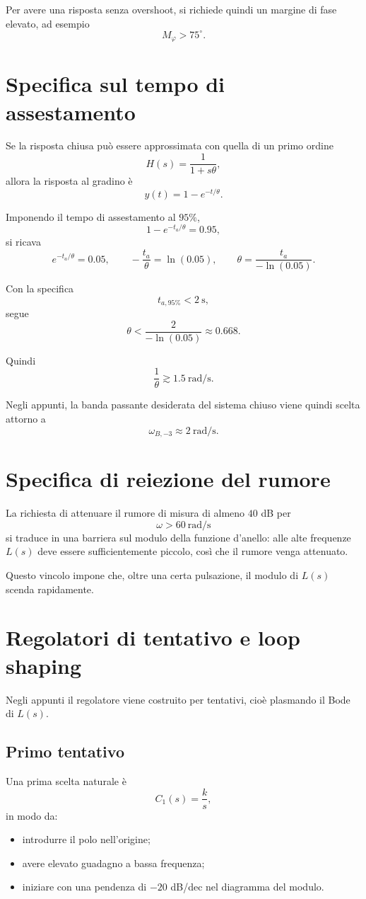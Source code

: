 Per avere una risposta senza overshoot, si richiede quindi un margine di fase elevato, ad esempio
\[
M_\varphi > 75^\circ.
\]

\section{Specifica sul tempo di assestamento}

Se la risposta chiusa pu\`o essere approssimata con quella di un primo ordine
\[
H(s)=\frac{1}{1+s\theta},
\]
allora la risposta al gradino \`e
\[
y(t)=1-e^{-t/\theta}.
\]

Imponendo il tempo di assestamento al \(95\%\),
\[
1-e^{-t_a/\theta}=0.95,
\]
si ricava
\[
e^{-t_a/\theta}=0.05,
\qquad
-\frac{t_a}{\theta}=\ln(0.05),
\qquad
\theta=\frac{t_a}{-\ln(0.05)}.
\]

Con la specifica
\[
t_{a,95\%}<2\ \text{s},
\]
segue
\[
\theta<\frac{2}{-\ln(0.05)} \approx 0.668.
\]

Quindi
\[
\frac{1}{\theta} \gtrsim 1.5\ \text{rad/s}.
\]

Negli appunti, la banda passante desiderata del sistema chiuso viene quindi scelta attorno a
\[
\omega_{B,-3}\approx 2\ \text{rad/s}.
\]

\section{Specifica di reiezione del rumore}

La richiesta di attenuare il rumore di misura di almeno \(40\) dB per
\[
\omega>60\ \text{rad/s}
\]
si traduce in una barriera sul modulo della funzione d'anello:
alle alte frequenze \(L(s)\) deve essere sufficientemente piccolo,
cos\`i che il rumore venga attenuato.

Questo vincolo impone che, oltre una certa pulsazione, il modulo di \(L(s)\)
scenda rapidamente.

\section{Regolatori di tentativo e loop shaping}

Negli appunti il regolatore viene costruito per tentativi, cio\`e plasmando il Bode di \(L(s)\).

\subsection{Primo tentativo}

Una prima scelta naturale \`e
\[
C_1(s)=\frac{k}{s},
\]
in modo da:
\begin{itemize}
    \item introdurre il polo nell'origine;
    \item avere elevato guadagno a bassa frequenza;
    \item iniziare con una pendenza di \(-20\) dB/dec nel diagramma del modulo.
\end{itemize}

